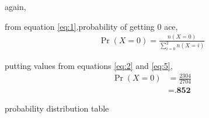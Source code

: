 \documentclass{beamer}
\providecommand{\brak}[1]{\ensuremath{\left(#1\right)}}
\begin{document}
\begin{frame}
again,

from equation \eqref{eq:1},probability of getting 0 ace,
\begin{align}
\Pr\brak{X = 0} = \frac{n\brak{X = 0}}{\sum_{i=0}^2 n\brak{X = i}}
\end{align}

putting values from equations \eqref{eq:2} and \eqref{eq:5},
\begin{align}
\Pr\brak{X = 0}&=\frac{2304}{2704}  \\
&=\textbf{.852}
\end{align}
\end{frame}
\begin{frame}
	\begin{table}[ht!]
		
		\centering
		\vspace{5pt}
		\caption{probability distribution table}
	\end{table}
	\end{frame}
\end{document}

